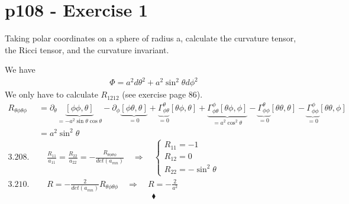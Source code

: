 \section{p108 - Exercise 1}
\begin{tcolorbox}
Taking polar coordinates on a sphere of radius a, calculate the curvature tensor, the Ricci tensor, and the curvature invariant.
\end{tcolorbox}
We have 
\begin{align}
 \Phi = a^2d\theta^2 + a^2\sin^2 \theta d\phi^2
\end{align}
We only have to calculate $R_{1212}$ (see exercise page 86).
\begin{align}
 R_{\theta\phi\theta\phi}&= \partial_{\theta}\underbrace{[\phi \phi,\theta]}_{= -a^2\sin\theta\cos\theta} -\partial_{\phi}\underbrace{[\phi \theta,\theta]}_{=0} + \underbrace{\Gamma^{\theta}_{\phi\theta}}_{=0}[\theta\phi,\theta]+ \underbrace{\Gamma^{\phi}_{\phi\theta}[\theta\phi,\phi]}_{=a^2\cos^2\theta} - \underbrace{\Gamma^{\theta}_{\phi\phi}}_{=0}[\theta\theta,\theta]- \underbrace{\Gamma^{\phi}_{\phi\phi}}_{=0}[\theta\theta,\phi]\\
 &= a^2\sin^2\theta\\
 \text{3.208. : }& \quad \frac{R_{11}}{a_{11}}=\frac{R_{22}}{a_{22}}=-\frac{R_{\theta\phi\theta\phi}}{det(a_{mn})}\quad\Rightarrow \quad \left \{ \begin{array}{l}
 R_{11} =  -1\\
 R_{12} = 0\\
 R_{22} =  -\sin^2\theta
\end{array} \right.\\
\text{3.210. : }& \quad R=-\frac{2}{det(a_{mn})}R_{\theta\phi\theta\phi}\quad\Rightarrow \quad R= -\frac{2}{a^2}
\end{align}
$$\blacklozenge$$
\newpage

